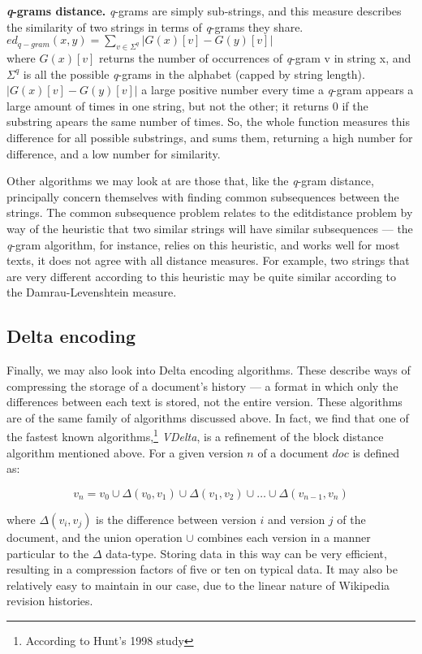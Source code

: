 \textbf{\textit{q}-grams distance.} \textit{q}-grams are simply
sub-strings, and this measure describes the similarity of two strings
in terms of \textit{q}-grams they
share.\cite{Ukkonen1992}\\ $ed_{q-gram}(x,y)=\sum\limits_{v\in\Sigma
  ^q}|G(x)[v]-G(y)[v]|$\\ where $G(x)[v]$ returns the number of
occurrences of \textit{q}-gram v in string x, and $\Sigma ^q$ is all
the possible \textit{q}-grams in the alphabet (capped by string
length). $|G(x)[v]-G(y)[v]|$ a large positive number every time a
\textit{q}-gram appears a large amount of times in one string, but not
the other; it returns 0 if the substring apears the same number of
times. So, the whole function measures this difference for all
possible substrings, and sums them, returning a high number for
difference, and a low number for similarity.


Other algorithms we may look at are those that, like the
\textit{q}-gram distance, principally concern themselves with finding
common subsequences between the strings. The common subsequence
problem relates to the editdistance problem by way of the
heuristic that two similar strings will have similar subsequences ---
the \textit{q}-gram algorithm, for instance, relies on this heuristic,
and works well for most texts, it does not agree with all distance
measures. For example, two strings that are very different according
to this heuristic may be quite similar according to the
Damrau-Levenshtein measure.


\subsection*{Delta encoding}
Finally, we may also look into Delta encoding algorithms. These
describe ways of compressing the storage of a document's history --- a
format in which only the differences between each text is stored, not
the entire version. These algorithms are of the same family of
algorithms discussed above. In fact, we find that one of the fastest
known algorithms,\footnote{According to Hunt's 1998
  study\cite{Hunt1998}} \textit{VDelta}, is a refinement of the block
distance algorithm mentioned above. For a given version $n$ of a
document $doc$ is defined as:

$$v_n = v_0 \cup {\Delta}(v_0,v_1) \cup {\Delta}(v_1,v_2) \cup \dots
\cup {\Delta}(v_{n-1},v_n) $$

where ${\Delta}(v_i,v_j)$ is the difference between version $i$ and
version $j$ of the document, and the union operation $\cup$ combines
each version in a manner particular to the $\Delta$ data-type. Storing
data in this way can be very efficient, resulting in a compression
factors of five or ten on typical data.\cite{Macdonald2000} It may
also be relatively easy to maintain in our case, due to the linear
nature of Wikipedia revision histories.
